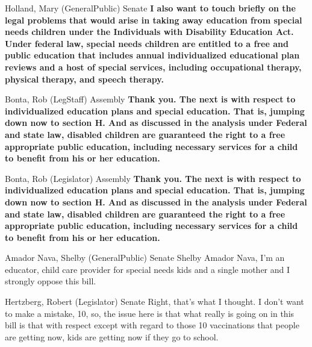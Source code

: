 \begin{result}{12.771668141654398}{Holland, Mary (GeneralPublic) Senate}
\textbf{I also want to touch briefly on the legal problems that would arise in taking away education from special needs children under the Individuals with Disability Education Act. Under federal law, special needs children are entitled to a free and public education that includes annual individualized educational plan reviews and a host of special services, including occupational therapy, physical therapy, and speech therapy.
}\end{result}

\begin{result}{11.435643821597985}{Bonta, Rob (LegStaff) Assembly}
\textbf{Thank you. The next is with respect to individualized education plans and special education. That is, jumping down now to section H. And as discussed in the analysis under Federal and state law, disabled children are guaranteed the right to a free appropriate public education, including necessary services for a child to benefit from his or her education.
}\end{result}

\begin{result}{11.435643821597985}{Bonta, Rob (Legislator) Assembly}
\textbf{Thank you. The next is with respect to individualized education plans and special education. That is, jumping down now to section H. And as discussed in the analysis under Federal and state law, disabled children are guaranteed the right to a free appropriate public education, including necessary services for a child to benefit from his or her education.
}\end{result}

\begin{result}{10.608660701613644}{Amador Nava, Shelby (GeneralPublic) Senate}
Shelby Amador Nava, I'm an educator, child care provider for special needs kids and a single mother and I strongly oppose this bill.
\end{result}

\begin{result}{10.583681489764441}{Hertzberg, Robert (Legislator) Senate}
Right, that's what I thought. I don't want to make a mistake, 10, so, the issue here is that what really is going on in this bill is that with respect except with regard to those 10 vaccinations that people are getting now, kids are getting now if they go to school.
\end{result}

